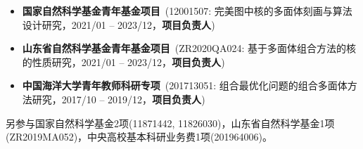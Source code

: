 %
%


{
\fontsize{9.5pt}{\baselineskip}\selectfont

\begin{itemize}[leftmargin=*]
	\item \textbf{国家自然科学基金青年基金项目}~(12001507: 完美图中核的多面体刻画与算法设计研究，2021/01 -- 2023/12，\textbf{项目负责人})
	\item \textbf{山东省自然科学基金青年基金项目}~(ZR2020QA024: 基于多面体组合方法的核的性质研究，2021/01 -- 2023/12，\textbf{项目负责人})
	\item \textbf{中国海洋大学青年教师科研专项}~(201713051: 组合最优化问题的组合多面体方法研究，2017/10 -- 2019/12，\textbf{项目负责人})
\end{itemize}

另参与国家自然科学基金2项(11871442, 11826030)，山东省自然科学基金1项(ZR2019MA052)，中央高校基本科研业务费1项(201964006)。
}
\iffalse
 \begin{tabular}{rl}	
	2021 -- 2023 & %
	{\hspace{-.5em}\textbf{国家自然科学基金青年基金项目}}~(12001507: 完美图中核的多面体刻画与算法设计研究)，\textbf{项目负责人}\\
	2020 -- 2023 & %
	{\hspace{-.5em}\textbf{山东省自然科学基金青年基金项目}}~(ZR2020QA024: 基于多面体组合方法的核的性质研究)，\textbf{项目负责人}\\
	2017 -- 2019 & %
	{\hspace{-.5em}\textbf{中国海洋大学青年教师科研专项}}~(201713051: 组合最优化问题的组合多面体方法研究)，\textbf{项目负责人}
\end{tabular}
\fi

